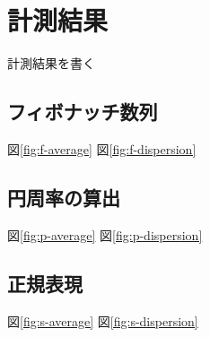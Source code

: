 \chapter{計測結果}
\label{cha:result}
計測結果を書く
\section{フィボナッチ数列}
図\ref{fig:f-average}
図\ref{fig:f-dispersion}

\section{円周率の算出}
図\ref{fig:p-average}
図\ref{fig:p-dispersion}


\section{正規表現}
図\ref{fig:s-average}
図\ref{fig:s-dispersion}

